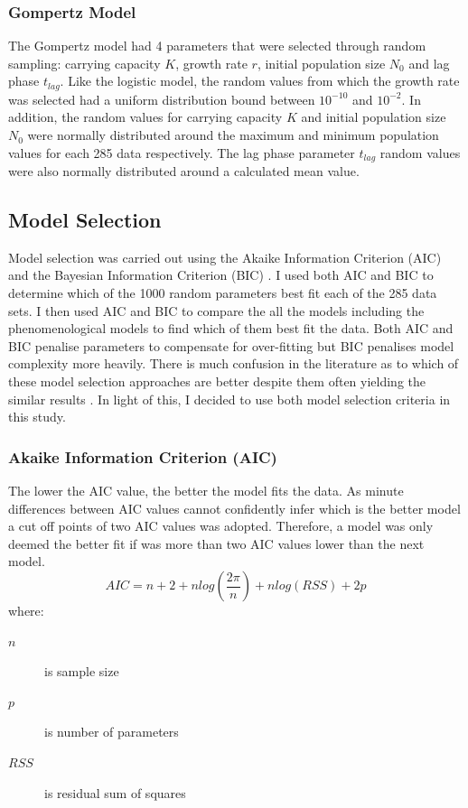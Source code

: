 \documentclass[11pt]{article}
\begin{document}
    \subsubsection{Gompertz Model}
    The Gompertz model had 4 parameters that were selected through random sampling: carrying capacity $K$, growth rate $r$, initial population size $N_0$ and lag phase $t_{lag}$. Like the logistic model, the random values from which the growth rate was selected had a uniform distribution bound between $10^{-10}$ and $10^{-2}$. In addition, the random values for carrying capacity $K$ and initial population size $N_0$ were normally distributed around the maximum and minimum population values for each 285 data respectively. The lag phase parameter $t_{lag}$ random values were also normally distributed around a calculated mean value.
    
    
    \subsection{Model Selection}
    Model selection was carried out using the Akaike Information Criterion (AIC) \citep{akaike1977entropy} and the Bayesian Information Criterion (BIC) \citep{schwarz1978estimating}. I used both AIC and BIC to determine which of the 1000 random parameters best fit each of the 285 data sets. I then used AIC and BIC to compare the all the models including the phenomenological models to find which of them best fit the data. Both AIC and BIC penalise parameters to compensate for over-fitting but BIC penalises model complexity more heavily. There is much confusion in the literature as to which of these model selection approaches are better despite them often yielding the similar results \citep{aho2014model}. In light of this, I decided to use both model selection criteria in this study.
    
    \subsubsection{Akaike Information Criterion (AIC)}
    The lower the AIC value, the better the model fits the data. As minute differences between AIC values cannot confidently infer which is the better model a cut off points of two AIC values was adopted. Therefore, a model was only deemed the better fit if was more than two AIC values lower than the next model.
    \[AIC = n + 2 + nlog(\frac{2 \pi }{n}) +nlog(RSS) + 2p\]
    where:
    \begin{description}
    \item[$n$] is sample size
    \item[$p$] is number of parameters
    \item[$RSS$] is residual sum of squares
    \end{description}
    
\end{document}
